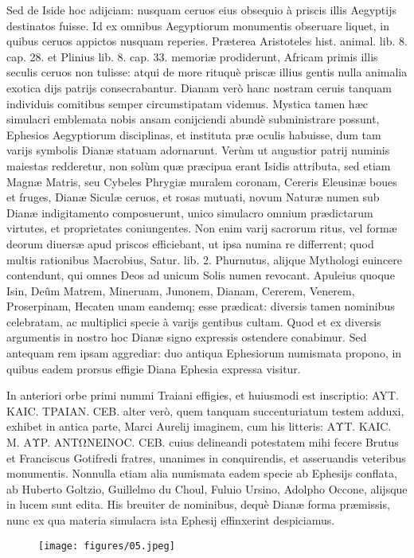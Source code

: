 \documentclass[a4paper, 11pt, oneside, polutonikogreek, latin]{article}
\begin{document}
Sed de Iside hoc adijciam: nusquam ceruos eius obsequio à priscis illis Aegyptijs destinatos fuisse. Id ex omnibus Aegyptiorum monumentis obseruare liquet, in quibus ceruos appictos nusquam reperies. Præterea Aristoteles hist. animal. lib. 8. cap. 28. et Plinius lib. 8. cap. 33. memoriæ prodiderunt, Africam primis illis seculis ceruos non tulisse: atqui de more rituquè priscæ illius gentis nulla animalia exotica dijs patrijs consecrabantur. Dianam verò hanc nostram ceruis tanquam individuis comitibus semper circumstipatam videmus. Mystica tamen hæc simulacri emblemata nobis ansam conijciendi abundè subministrare possunt, Ephesios Aegyptiorum disciplinas, et instituta præ oculis habuisse, dum tam varijs symbolis Dianæ statuam adornarunt. Verùm ut augustior patrij numinis maiestas redderetur, non solùm quæ præcipua erant Isidis attributa, sed etiam Magnæ Matris, seu Cybeles Phrygiæ muralem coronam, Cereris Eleusinæ boues et fruges, Dianæ Siculæ ceruos, et rosas mutuati, novum Naturæ numen sub Dianæ indigitamento composuerunt, unico simulacro omnium prædictarum virtutes, et proprietates coniungentes. Non enim varij sacrorum ritus, vel formæ deorum diuersæ apud priscos efficiebant, ut ipsa numina re differrent; quod multis rationibus Macrobius, Satur. lib. 2. Phurnutus, alijque Mythologi euincere contendunt, qui omnes Deos ad unicum Solis numen revocant. Apuleius quoque Isin, Deûm Matrem, Mineruam, Junonem, Dianam, Cererem, Venerem, Proserpinam, Hecaten unam eandemq; esse prædicat: diversis tamen nominibus celebratam, ac multiplici specie à varijs gentibus cultam. Quod et ex diversis argumentis in nostro hoc Dianæ signo expressis ostendere conabimur. Sed antequam rem ipsam aggrediar: duo antiqua Ephesiorum numismata propono, in quibus eadem prorsus effigie Diana Ephesia expressa visitur.

In anteriori orbe primi nummi Traiani effigies, et huiusmodi est inscriptio: AYT. KAIC. TPAIAN. CEB. alter verò, quem tanquam succenturiatum testem adduxi, exhibet in antica parte, Marci Aurelij imaginem, cum his litteris: AΥT. KAIC. M. AΥP. ANTΩNEINOC. CEB. cuius delineandi potestatem mihi fecere Brutus et Franciscus Gotifredi fratres, unanimes in conquirendis, et asseruandis veteribus monumentis. Nonnulla etiam alia numismata eadem specie ab Ephesijs conflata, ab Huberto Goltzio, Guillelmo du Choul, Fuluio Ursino, Adolpho Occone, alijsque in lucem sunt edita. His breuiter de nominibus, dequè Dianæ forma præmissis, nunc ex qua materia simulacra ista Ephesij effinxerint despiciamus.
\clearpage
\vspace*{\fill}
\begin{figure}[H]
\centering
\texttt{[image: figures/05.jpeg]}
\end{figure}
\vspace*{\fill}
\clearpage
\end{document}
